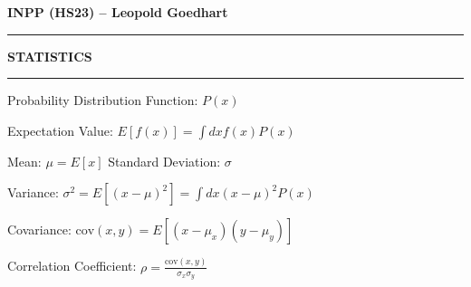 \documentclass[10pt]{article}
\begin{document}
\begin{multicols*}{4}

\textbf{INPP (HS23) – Leopold Goedhart}

\vspace{0.1cm}
\hrule
\vspace{0.1cm}

\textbf{STATISTICS}

\vspace{0.1cm}
\hrule
\vspace{0.1cm}

Probability Distribution Function: $P(x)$

Expectation Value: $E[f(x)]=\int dxf(x)P(x)$

Mean: $\mu=E[x]$ \qquad Standard Deviation: $\sigma$

Variance: $\sigma^2=E[(x-\mu)^2]=\int dx(x-\mu)^2P(x)$

Covariance: $\text{cov}(x,y)=E[(x-\mu_x)(y-\mu_y)]$

Correlation Coefficient: $\rho=\frac{\text{cov}(x,y)}{\sigma_x\sigma_y}$

\end{multicols*}
\end{document}
